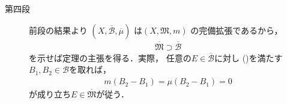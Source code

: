 \begin{prf}
\begin{description}
				\item[第四段]
					前段の結果より
					$\left(X, \overline{\mathcal{B}}, \overline{\mu} \right)$
					は$\left( X, \mathfrak{M}, m \right)$
					の完備拡張であるから，
					\begin{align}
						\overline{\mathfrak{M}}
						\supset \overline{\mathcal{B}}
					\end{align}
					を示せば定理の主張を得る．実際，
					任意の$E \in \overline{\mathcal{B}}$に対し
					()を満たす
					$B_1,B_2 \in \mathcal{B}$を取れば，
					\begin{align}
						m(B_2-B_1)
						= \mu(B_2-B_1)
						= 0
					\end{align}
					が成り立ち$E \in \overline{\mathfrak{M}}$が従う．
					\QED
			\end{description}
		\end{prf}